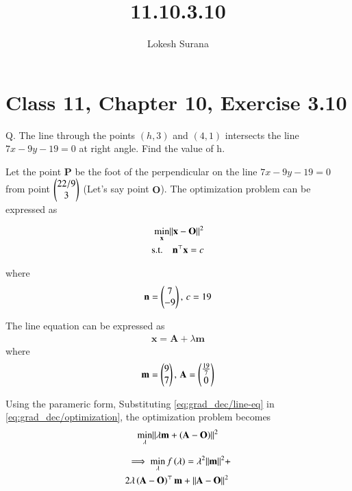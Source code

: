 \documentclass[journal,12pt,twocolumn]{IEEEtran}
\renewcommand{\vec}[1]{\boldsymbol{\mathbf{#1}}}
\begin{document}
\vspace{3cm}
\title{11.10.3.10}
\author{Lokesh Surana}
\maketitle
\section*{Class 11, Chapter 10, Exercise 3.10}

Q. The line through the points $(h, 3)$ and $(4, 1)$ intersects the line $7{x} - 9{y} - 19 = 0$ at right angle. Find the value of h.

\solution Let the point $\vec{P}$ be the foot of the perpendicular on the line $7{x} - 9{y} - 19 = 0$ from point $\begin{pmatrix}22/9\\3\end{pmatrix}$ (Let's say point $\vec{O}$).
The optimization problem can be expressed as

\begin{align}
    \label{eq:grad_dec/optimization}
    \min_{\vec{x}} \norm{\vec{x}-\vec{O}}^2\\
    \text{s.t.} \quad \vec{n}^\top\vec{x} = c
\end{align}

where
\begin{align}
    \vec{n} = \myvec{7 \\ -9},\,c = 19
\end{align}

The line equation can be expressed as
\begin{align}
    \label{eq:grad_dec/line-eq}
    \vec{x} = \vec{A}+\lambda\vec{m}
\end{align}
where
\begin{align}
    \vec{m} = \myvec{9            \\ 7},\,
    \vec{A} = \myvec{\frac{19}{7} \\ 0}
\end{align}

Using the parameric form, Substituting \eqref{eq:grad_dec/line-eq} in \eqref{eq:grad_dec/optimization}, the optimization problem becomes
\begin{align}
    \min_{\lambda} \norm{ \lambda\vec{m} +\brak{\vec{A}-\vec{O}}}^2
\end{align}

\begin{align}
    \begin{split}
        \ \implies \min_{\lambda}f\brak{\lambda} = \lambda^2\norm{\vec{m}}^2 + \\ 2\lambda\brak{\vec{A}-\vec{O}}^\top\vec{m} + \norm{\vec{A}-\vec{O}}^2 \
    \end{split}
\end{align}
\end{document}
